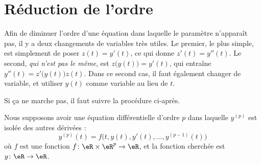 \section{Réduction de l'ordre}
\label{SecWGdleRM}

Afin de diminuer l'ordre d'une équation dans laquelle le paramètre n'apparaît pas, il y a deux changements de variables très utiles. Le premier, le plus simple, est simplement de poser $z(t)=y'(t)$, ce qui donne $z'(t)=y''(t)$. Le second, \emph{qui n'est pas le même}, est $z\big( y(t) \big)=y'(t)$, qui entraîne $y''(t)=z'\big( y(t) \big)z(t)$. Dans ce second cas, il faut également changer de variable, et utiliser $y(t)$ comme variable au lieu de $t$.


Si ça ne marche pas, il faut suivre la procédure ci-après.

Nous supposons avoir une équation différentielle d'ordre \( p\) dans laquelle \( y^{(p)}\) est isolée des autres dérivées : 
\begin{equation}    \label{EqHDeVQgn}
 y^{(p)}(t)=f\big( t,y(t),y'(t),\ldots, y^{(p-1)}(t) \big)  
\end{equation}
où \( f\) est une fonction \( f\colon \eR\times \eR^p\to \eR\), et la fonction cherchée est \( y\colon \eR\to \eR\).

